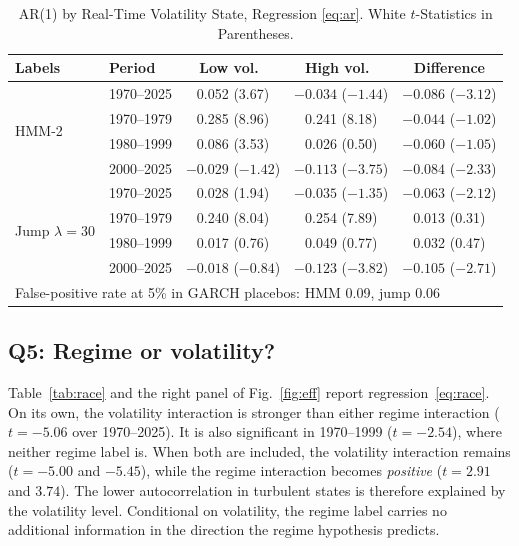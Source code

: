 \documentclass[conference]{IEEEtran}
\begin{document}
\begin{table}[t]
\centering
\caption{AR(1) by Real-Time Volatility State, Regression \eqref{eq:ar}. White $t$-Statistics in Parentheses.}
\label{tab:ar}
\footnotesize
\setlength{\tabcolsep}{2.5pt}
\begin{tabular}{llccc}
\toprule
Labels & Period & Low vol.\ & High vol.\ & Difference \\
\midrule
\multirow{4}{*}{HMM-2} & 1970--2025 & 0.052 (3.67) & $-0.034$ ($-1.44$) & $-0.086$ ($-3.12$) \\
 & 1970--1979 & 0.285 (8.96) & 0.241 (8.18) & $-0.044$ ($-1.02$) \\
 & 1980--1999 & 0.086 (3.53) & 0.026 (0.50) & $-0.060$ ($-1.05$) \\
 & 2000--2025 & $-0.029$ ($-1.42$) & $-0.113$ ($-3.75$) & $-0.084$ ($-2.33$) \\
\midrule
\multirow{4}{*}{Jump $\lambda{=}30$} & 1970--2025 & 0.028 (1.94) & $-0.035$ ($-1.35$) & $-0.063$ ($-2.12$) \\
 & 1970--1979 & 0.240 (8.04) & 0.254 (7.89) & 0.013 (0.31) \\
 & 1980--1999 & 0.017 (0.76) & 0.049 (0.77) & 0.032 (0.47) \\
 & 2000--2025 & $-0.018$ ($-0.84$) & $-0.123$ ($-3.82$) & $-0.105$ ($-2.71$) \\
\midrule
\multicolumn{5}{l}{False-positive rate at 5\% in GARCH placebos: HMM 0.09, jump 0.06}\\
\bottomrule
\end{tabular}
\end{table}

\subsection{Q5: Regime or volatility?}
Table~\ref{tab:race} and the right panel of Fig.~\ref{fig:eff} report regression~\eqref{eq:race}. On its own, the volatility interaction is stronger than either regime interaction ($t = -5.06$ over 1970--2025). It is also significant in 1970--1999 ($t = -2.54$), where neither regime label is. When both are included, the volatility interaction remains ($t = -5.00$ and $-5.45$), while the regime interaction becomes \emph{positive} ($t = 2.91$ and $3.74$). The lower autocorrelation in turbulent states is therefore explained by the volatility level. Conditional on volatility, the regime label carries no additional information in the direction the regime hypothesis predicts.
\end{document}
